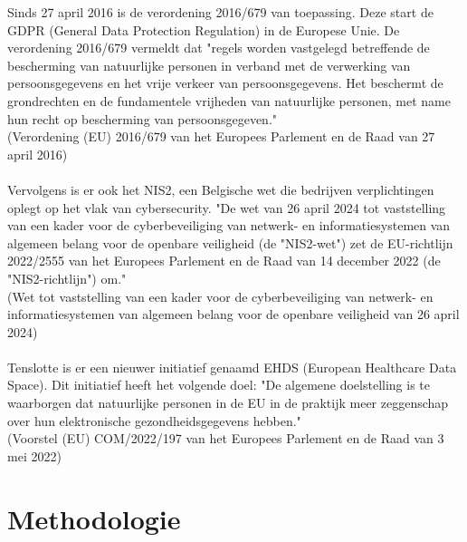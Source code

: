 Sinds 27 april 2016 is de verordening 2016/679 van toepassing. Deze start de GDPR (General Data Protection Regulation) in de Europese Unie. De verordening 2016/679 vermeldt dat "regels worden vastgelegd betreffende de bescherming van natuurlijke personen in verband met de verwerking van persoonsgegevens en het vrije verkeer van persoonsgegevens. Het beschermt de grondrechten en de fundamentele vrijheden van natuurlijke personen, met name hun recht op bescherming van persoonsgegeven."\\ (Verordening (EU) 2016/679 van het Europees Parlement en de Raad van 27 april 2016) %
\\\\
Vervolgens is er ook het NIS2, een Belgische wet die bedrijven verplichtingen oplegt op het vlak van cybersecurity. "De wet van 26 april 2024 tot vaststelling van een kader voor de cyberbeveiliging van netwerk- en informatiesystemen van algemeen belang voor de openbare veiligheid (de "NIS2-wet") zet de EU-richtlijn 2022/2555 van het Europees Parlement en de Raad van 14 december 2022 (de "NIS2-richtlijn") om." \\
(Wet tot vaststelling van een kader voor de cyberbeveiliging van netwerk- en informatiesystemen van algemeen belang voor de openbare veiligheid van 26 april 2024) %
\\\\
Tenslotte is er een nieuwer initiatief genaamd EHDS (European Healthcare Data Space). Dit initiatief heeft het volgende doel: "De algemene doelstelling is te waarborgen dat natuurlijke personen in de EU in de praktijk meer zeggenschap over hun elektronische gezondheidsgegevens hebben."\\ (Voorstel (EU) COM/2022/197 van het Europees Parlement en de Raad van 3 mei 2022) %


\section{Methodologie}%
\label{sec:methodologie}

